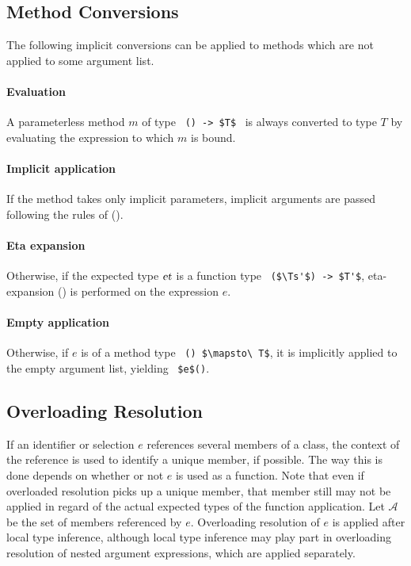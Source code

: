 \subsection{Method Conversions}
\label{sec:method-conversions}

The following implicit conversions can be applied to methods which are not applied to some argument list. 

\paragraph{Evaluation}
A parameterless method $m$ of type ~\lstinline!() -> $T$!~ is always converted to type $T$ by evaluating the expression to which $m$ is bound. 

\paragraph{Implicit application}
If the method takes only implicit parameters, implicit arguments are passed following the rules of ().

\paragraph{Eta expansion}
Otherwise, if the expected type $\mbox{\sl et}$ is a function type ~\lstinline!($\Ts'$) -> $T'$!, eta-expansion () is performed on the expression $e$. 

\paragraph{Empty application}
Otherwise, if $e$ is of a method type ~\lstinline!() $\mapsto\ T$!, it is implicitly applied to the empty argument list, yielding ~\lstinline!$e$()!. 






\subsection{Overloading Resolution}
\label{sec:overloading-resolution}

If an identifier or selection $e$ references several members of a class, the context of the reference is used to identify a unique member, if possible. The way this is done depends on whether or not $e$ is used as a function. Note that even if overloaded resolution picks up a unique member, that member still may not be applied in regard of the actual expected types of the function application. Let $\mathcal{A}$ be the set of members referenced by $e$. Overloading resolution of $e$ is applied after local type inference, although local type inference may play part in overloading resolution of nested argument expressions, which are applied separately. 

